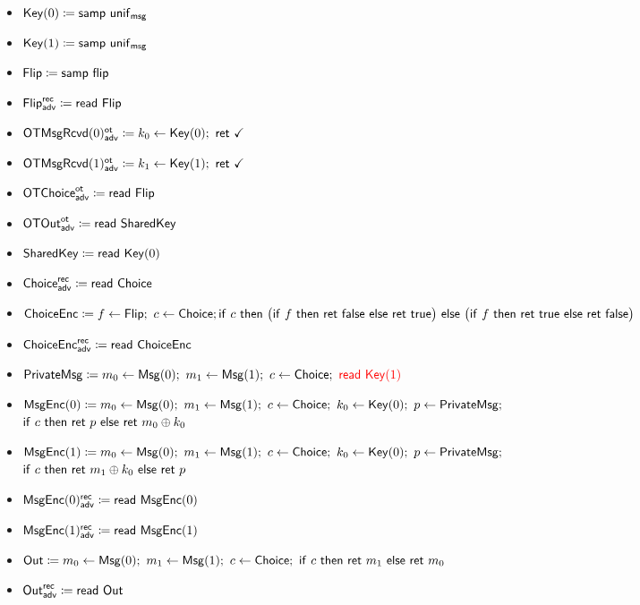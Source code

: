 \begin{itemize}
\item $\mathsf{Key}(0) \coloneqq \mathsf{samp} \ \mathsf{unif}_{\mathsf{msg}}$
\item {\color{red} $\mathsf{Key}(1) \coloneqq \mathsf{samp} \ \mathsf{unif}_{\mathsf{msg}}$}
\item $\mathsf{Flip} \coloneqq \mathsf{samp} \ \mathsf{flip}$
\item {\color{blue} $\mathsf{Flip}^{\mathsf{rec}}_{\mathsf{adv}} \coloneqq \mathsf{read} \ \mathsf{Flip}$}
\item {\color{blue} $\LeakOTMsgRcvd(0)^\ot_\adv \coloneqq k_0 \leftarrow \Key(0); \ \ret{\checkmark}$}
\item {\color{blue} $\LeakOTMsgRcvd(1)^\ot_\adv \coloneqq k_1 \leftarrow \Key(1); \ \ret{\checkmark}$}
\item {\color{blue} $\mathsf{OTChoice}^{\mathsf{ot}}_{\mathsf{adv}} \coloneqq \mathsf{read} \ \mathsf{Flip}$}
\item {\color{blue} $\mathsf{OTOut}^{\mathsf{ot}}_{\mathsf{adv}} \coloneqq \mathsf{read} \ \mathsf{SharedKey}$}
\item $\mathsf{SharedKey} \coloneqq \mathsf{read} \ \mathsf{Key}(0)$
\item {\color{blue} $\mathsf{Choice}^{\mathsf{rec}}_{\mathsf{adv}} \coloneqq \mathsf{read} \ \mathsf{Choice}$}
\item $\mathsf{ChoiceEnc} \coloneqq f \leftarrow \mathsf{Flip}; \ c \leftarrow \mathsf{Choice}; \\ \mathsf{if} \ c \ \mathsf{then} \ \big(\mathsf{if} \ f \ \mathsf{then} \ \mathsf{ret} \ \mathsf{false} \ \mathsf{else} \ \mathsf{ret} \ \mathsf{true}\big) \ \mathsf{else} \ \big(\mathsf{if} \ f \ \mathsf{then} \ \mathsf{ret} \ \mathsf{true} \ \mathsf{else} \ \mathsf{ret} \ \mathsf{false}\big)$
\item {\color{blue} $\mathsf{ChoiceEnc}^{\mathsf{rec}}_{\mathsf{adv}} \coloneqq \mathsf{read} \ \mathsf{ChoiceEnc}$}
\item $\PrivateMsg \coloneqq m_0 \leftarrow \Msg(0); \ m_1 \leftarrow \Msg(1); \ c \leftarrow \Choice; \ {\color{red} \read{\Key(1)}}$
\item $\mathsf{MsgEnc}(0) \coloneqq m_0 \leftarrow \mathsf{Msg}(0); \ m_1 \leftarrow \mathsf{Msg}(1); \ c \leftarrow \mathsf{Choice}; \ k_0 \leftarrow \mathsf{Key}(0); \ p \leftarrow \mathsf{PrivateMsg};$ \\ $\mathsf{if} \ c \ \mathsf{then} \ \mathsf{ret} \ p \ \mathsf{else} \ \mathsf{ret} \ m_0 \oplus k_0$
\item $\mathsf{MsgEnc}(1) \coloneqq m_0 \leftarrow \mathsf{Msg}(0); \ m_1 \leftarrow \mathsf{Msg}(1); \ c \leftarrow \mathsf{Choice}; \ k_0 \leftarrow \mathsf{Key}(0); \ p \leftarrow \mathsf{PrivateMsg};$ \\ $\mathsf{if} \ c \ \mathsf{then} \ \mathsf{ret} \ m_1 \oplus k_0 \ \mathsf{else} \ \mathsf{ret} \ p$
\item {\color{blue} $\mathsf{MsgEnc}(0)^{\mathsf{rec}}_{\mathsf{adv}} \coloneqq \mathsf{read} \ \mathsf{MsgEnc}(0)$}
\item {\color{blue} $\mathsf{MsgEnc}(1)^{\mathsf{rec}}_{\mathsf{adv}} \coloneqq \mathsf{read} \ \mathsf{MsgEnc}(1)$}\medskip
\item $\Out \coloneqq m_0 \leftarrow \Msg(0); \ m_1 \leftarrow \Msg(1); \ c \leftarrow \Choice; \ \ifte{c}{\ret{m_1}}{\ret{m_0}}$
\item {\color{blue} $\mathsf{Out}^{\mathsf{rec}}_{\mathsf{adv}} \coloneqq \mathsf{read} \ \mathsf{Out}$}
\end{itemize}

